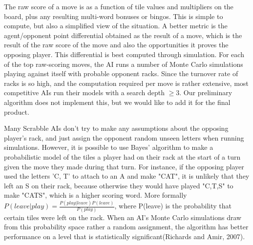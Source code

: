 \documentclass[12pt]{article}
\begin{document}
The raw score of a move is as a function of tile values and
multipliers on the board, plus any resulting multi-word bonuses or
bingos. This is simple to compute, but also a simplified view of the
situation. A better metric is the agent/opponent point differential
obtained as the result of a move, which is the result of the raw score
of the move and also the opportunities it proves the opposing
player. This differential is best computed through simulation. For
each of the top raw-scoring moves, the AI runs a number of Monte Carlo
simulations playing against itself with probable opponent racks. Since
the turnover rate of racks is so high, and the computation required
per move is rather extensive, most competitive AIs run their models
with a search depth $\geq 3$. Our preliminary algorithm does not
implement this, but we would like to add it for the final product.

Many Scrabble AIs don't try to make any assumptions about the opposing
player's rack, and just assign the opponent random unseen letters when
running simulations. However, it is possible to use Bayes' algorithm
to make a probabilistic model of the tiles a player had on their rack
at the start of a turn given the move they made during that turn.%
For instance, if the opposing player used the letters 'C, T' to attach
to an A and make "CAT", it is unlikely that they left an S on their
rack, because otherwise they would have played "C,T,S" to make "CATS",
which is a higher scoring word. More formally $P(leave | play) =
\frac{P(play | leave)P(leave)}{P(play)}$, where P(leave) is the
probability that certain tiles were left on the rack. When an AI's
Monte Carlo simulations draw from this probability space rather a
random assignment, the algorithm has better performance on a level
that is statistically significant(Richards and Amir, 2007).

	

\end{document}
